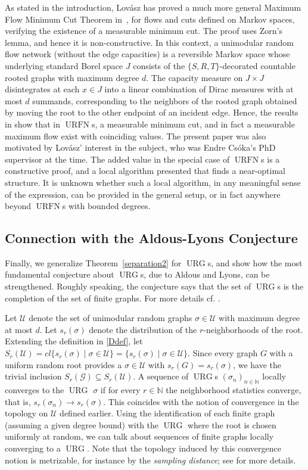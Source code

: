\documentclass[12pt,a4paper]{article}
\newcommand{\G}{\mathcal{G}}
\newcommand{\N}{\mathbb{N}}
\newcommand{\U}{\mathcal{U}}
\renewcommand{\:}{\colon}
\DeclareMathOperator{\URG}{URG}
\DeclareMathOperator{\URN}{URFN}
\begin{document}
As stated in the introduction, Lovász has proved a much more general Maximum Flow Minimum Cut Theorem in~\cite{Lovaszmeasure}, for flows and cuts defined on Markov spaces, verifying the existence of a measurable minimum cut. 
The proof uses Zorn's lemma, and hence it is non-constructive. 
In this context, a unimodular random flow network (without the edge capacities) is a reversible Markov space whose underlying standard Borel space $J$ consists of the $\{S,R,T\}$-decorated countable rooted graphs with maximum degree $d$. 
The capacity measure on $J\times J$ disintegrates at each $x\in J$ into a linear combination of Dirac measures with at most $d$ summands, corresponding to the neighbors of the rooted graph obtained by moving the root to the other endpoint of an incident edge. 
Hence, the results in \cite{Lovaszmeasure} show that in $\URN$s, a measurable minimum cut, and in fact a measurable maximum flow exist with coinciding values. 
The present paper was also motivated by Lov\'asz' interest in the subject, who was Endre Cs\'oka's PhD supervisor at the time. The added value in the special case of $\URN$s is a constructive proof, and a local algorithm presented that finds a near-optimal structure. 
It is unknown whether such a local algorithm, in any meaningful sense of the expression, can be provided in the general setup, or in fact anywhere beyond $\URN$s with bounded degrees. 


\subsection{Connection with the Aldous-Lyons Conjecture}

Finally, we generalize Theorem~\ref{separation2} for $\URG$s, and show how the most fundamental conjecture about $\URG$s, due to Aldous and Lyons, can be strengthened. 
Roughly speaking, the conjecture says that the set of $\URG$s is the completion of the set of finite graphs. 
For more details cf. \cite{AlLy, Lovasz}. 

Let $\U$ denote the set of unimodular random graphs $\sigma \in \U$ with maximum degree at most $d$. 
Let $s_r(\sigma)$ denote the distribution of the $r$-neighborhoods of the root. 
Extending the definition in \eqref{Ddef}, let $S_r(\U) = cl\big\{s_r(\sigma) \mid \sigma \in \U \big\}= \big\{s_r(\sigma) \mid \sigma \in \U \big\}$. 
Since every graph $G$ with a uniform random root provides a $\sigma \in \U$ with $s_r(G) = s_r(\sigma)$, we have the trivial inclusion $S_r(\G) \subseteq S_r(\U)$. 
A sequence of $\URG$s $(\sigma_n)_{n\in \N}$ locally converges to the $\URG$ $\sigma$ if for every $r\in \N$ the neighborhood statistics converge, that is, $s_r(\sigma_n)\rightarrow s_r(\sigma)$. 
This coincides with the notion of convergence in the topology on $\U$ defined earlier. 
Using the identification of each finite graph (assuming a given degree bound) with the $\URG$ where the root is chosen uniformly at random, we can talk about sequences of finite graphs locally converging to a $\URG$. 
Note that the topology induced by this convergence notion is metrizable, for instance by the \emph{sampling distance};  see \cite{Lovaszbook} for more details. 
\end{document}
